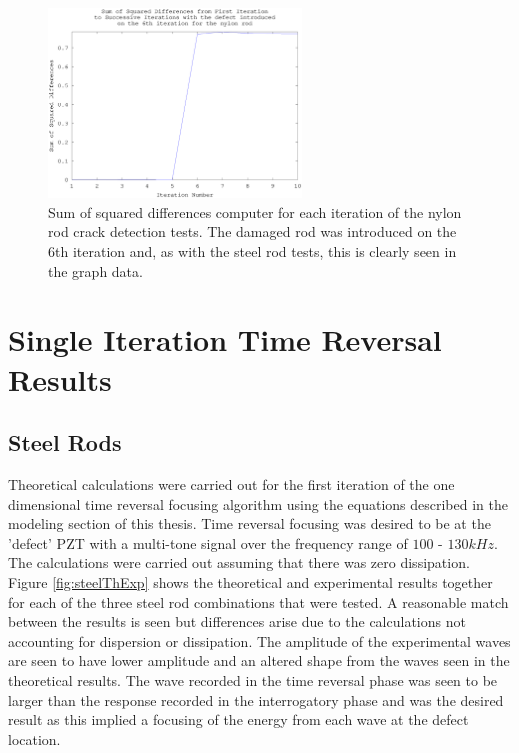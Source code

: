 \begin{figure}[ht!]
\centering
\includegraphics[width=0.6\textwidth]{eps_pics/nylonDifferences}
\caption{Sum of squared differences computer for each iteration of the nylon rod crack detection tests. The damaged rod was introduced on the 6th iteration and, as with the steel rod tests, this is clearly seen in the graph data.
 	 \label{fig:nylonDifferences}} 
\end{figure}

\section{Single Iteration Time Reversal Results}

\subsection{Steel Rods}
Theoretical calculations were carried out for the first iteration of the one dimensional time reversal focusing algorithm using the equations described in the modeling section of this thesis. Time reversal focusing was desired to be at the 'defect' PZT with a multi-tone signal over the frequency range of $100$ - $130kHz$. The calculations were carried out assuming that there was zero dissipation. Figure \ref{fig:steelThExp} shows the theoretical and experimental results together for each of the three steel rod combinations that were tested. A reasonable match between the results is seen but differences arise due to the calculations not accounting for dispersion or dissipation. The amplitude of the experimental waves are seen to have lower amplitude and an altered shape from the waves seen in the theoretical results. The wave recorded in the time reversal phase was seen to be larger than the response recorded in the interrogatory phase and was the desired result as this implied a focusing of the energy from each wave at the defect location.

